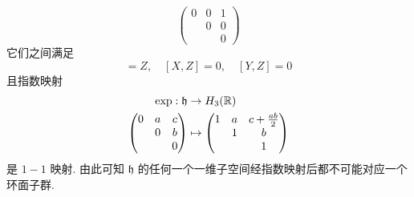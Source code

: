 \begin{example}
\begin{equation*}
\begin{pmatrix}
                    0 & 0 & 1 \\
                      & 0 & 0 \\
                      &   & 0
                \end{pmatrix}
            \end{equation*}
            它们之间满足
            \begin{equation*}
                [X,Y]=Z,\quad[X,Z]=0,\quad[Y,Z]=0
            \end{equation*}
            且指数映射
            \begin{align*}
                \exp:\mathfrak{h}&\rightarrow H_3(\mathbb{R}) \\
                \begin{pmatrix}
                    0 & a & c \\
                      & 0 & b \\
                      &   & 0
                \end{pmatrix}&\mapsto
                \begin{pmatrix}
                    1 & a & c+\frac{ab}{2} \\
                      & 1 & b \\
                      &   & 1
                \end{pmatrix}
            \end{align*}
            是 $1-1$ 映射. 由此可知 $\mathfrak{h}$ 的任何一个一维子空间经指数映射后都不可能对应一个环面子群.
        \end{example}